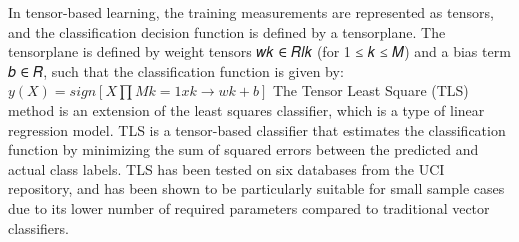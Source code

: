 \documentclass{article}
\theoremstyle{mytheoremstyle}
\theoremstyle{mytheoremstyle}
\theoremstyle{myproblemstyle}
\begin{document}
In tensor-based learning, the training measurements are represented as tensors, and the classification decision function is defined by a tensorplane. The tensorplane is defined by weight tensors 𝑤𝑘 ∈ 𝑅𝑙𝑘 (for 1 ≤ 𝑘 ≤ 𝑀) and a bias term 𝑏 ∈ 𝑅, such that the classification function is given by:
\begin{math}
	y(𝑋) = sign[𝑋 ∏𝑀𝑘=1 𝑥𝑘 → 𝑤𝑘 + 𝑏]
\end{math}
The Tensor Least Square (TLS) method is an extension of the least squares classifier, which is a type of linear regression model. TLS is a tensor-based classifier that estimates the classification function by minimizing the sum of squared errors between the predicted and actual class labels. TLS has been tested on six databases from the UCI repository, and has been shown to be particularly suitable for small sample cases due to its lower number of required parameters compared to traditional vector classifiers.
\end{document}
